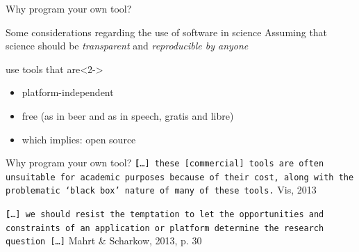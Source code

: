\documentclass{beamer}
\begin{document}
\begin{frame}{Why program your own tool?}
\end{frame}

\begin{frame}{Some considerations regarding the use of software in science}
Assuming that science should be \emph{transparent} and \emph{reproducible by anyone}
\begin{block}{use tools that are}<2->
\begin{itemize}
\item platform-independent 
\item free (as in beer and as in speech, gratis and libre)
\item which implies: open source
\end{itemize}
\end{block}
\end{frame}

\begin{frame}{Why program your own tool?}
\vspace{1cm}
{\tt \textbf
{[}\ldots{]} these {[}commercial{]} tools are often unsuitable for academic purposes because of their cost, along with the problematic ‘black box’ nature of many of these tools.}
{\footnotesize{Vis, 2013\\}}
\vspace{1cm}

{\tt \textbf
{[}\ldots{]} we should resist the temptation to let the opportunities and constraints of an application or platform determine the research question {[}\ldots{]}}
{\footnotesize{Mahrt \& Scharkow, 2013, p. 30\\}}

\end{frame}
\end{document}
